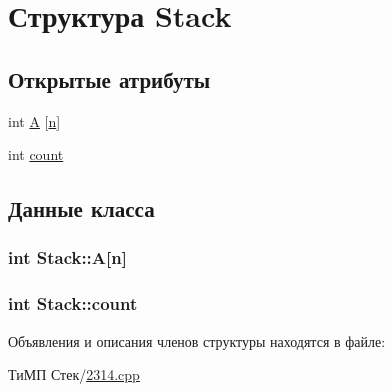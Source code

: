 \hypertarget{struct_stack}{}\section{Структура Stack}
\label{struct_stack}
\subsection*{Открытые атрибуты}
\begin{DoxyCompactItemize}
\item 
int \hyperlink{struct_stack_ab8717eb901054fc5ca7bf9921400149d}{A} \mbox{[}\hyperlink{2314_8cpp_acfc02ec89670db29251fda6a66602ce2}{n}\mbox{]}
\item 
int \hyperlink{struct_stack_aded5e35a644750ee65b42e50ba867571}{count}
\end{DoxyCompactItemize}


\subsection{Данные класса}
\hypertarget{struct_stack_ab8717eb901054fc5ca7bf9921400149d}{}
\subsubsection[{A}]{\setlength{\rightskip}{0pt plus 5cm}int Stack\+::\+A\mbox{[}{\bf n}\mbox{]}}\label{struct_stack_ab8717eb901054fc5ca7bf9921400149d}
\hypertarget{struct_stack_aded5e35a644750ee65b42e50ba867571}{}
\subsubsection[{count}]{\setlength{\rightskip}{0pt plus 5cm}int Stack\+::count}\label{struct_stack_aded5e35a644750ee65b42e50ba867571}


Объявления и описания членов структуры находятся в файле\+:\begin{DoxyCompactItemize}
\item 
ТиМП Стек/\hyperlink{2314_8cpp}{2314.\+cpp}\end{DoxyCompactItemize}

